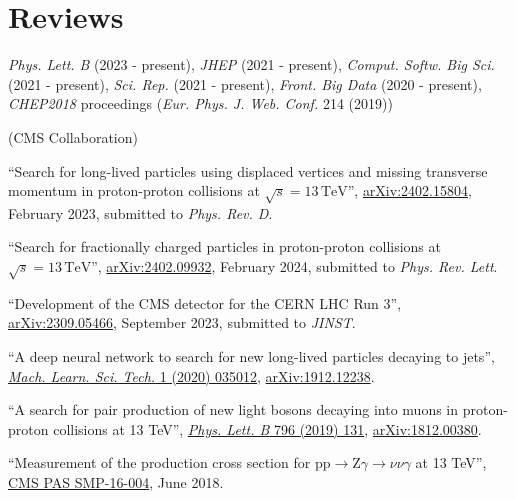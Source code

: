 \section{Reviews}
\begin{description}[leftmargin=12pt,font=\normalfont\textit]
\item[Journal referee:]
\begin{description}[leftmargin=12pt,font=\normalfont,labelsep=0em]\item[]
\item \emph{Phys. Lett. B} (2023 - present), \emph{JHEP} (2021 - present), \emph{Comput. Softw. Big Sci.} (2021 - present), \emph{Sci. Rep.} (2021 - present), \emph{Front. Big Data} (2020 - present), \emph{CHEP2018} proceedings (\emph{Eur. Phys. J. Web. Conf.} 214 (2019))
\end{description}
\item[Analysis Review Committee (ARC) member:] (CMS Collaboration)
\begin{description}[leftmargin=12pt,font=\normalfont,labelsep=0em]
\item ``Search for long-lived particles using displaced vertices and missing transverse momentum in proton-proton collisions at $\sqrt{s} = 13\,\text{TeV}$'', \href{https://arxiv.org/abs/2402.15804}{arXiv:2402.15804}, February 2023, submitted to \emph{Phys. Rev. D}.
\item ``Search for fractionally charged particles in proton-proton collisions at $\sqrt{s} = 13\,\text{TeV}$'', \href{https://arxiv.org/abs/2402.09932}{arXiv:2402.09932}, February 2024, submitted to \emph{Phys. Rev. Lett}.
\item ``Development of the CMS detector for the CERN LHC Run 3'', \href{https://arxiv.org/abs/2309.05466}{arXiv:2309.05466}, September 2023, submitted to \emph{JINST}.
\item ``A deep neural network to search for new long-lived particles decaying to jets'', \href{https://doi.org/10.1088/2632-2153/ab9023}{\emph{Mach. Learn. Sci. Tech.} 1 (2020) 035012}, \href{https://arxiv.org/abs/1912.12238}{arXiv:1912.12238}.
\item \begin{sloppypar}``A search for pair production of new light bosons decaying into muons in proton-proton collisions at 13 TeV'', \href{http://dx.doi.org/10.1016/j.physletb.2019.07.013}{\emph{Phys. Lett. B} 796 (2019) 131}, \href{https://arxiv.org/abs/1812.00380}{arXiv:1812.00380}.\end{sloppypar}
\item ``Measurement of the production cross section for $\text{p}\text{p} \to \text{Z}\gamma \to \nu\nu\gamma$ at 13 TeV'', \href{https://cds.cern.ch/record/2204922}{CMS PAS SMP-16-004}, June 2018.

\end{description}
\end{description}
